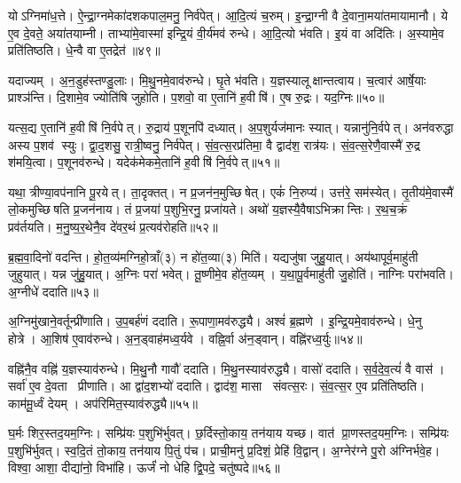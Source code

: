 योऽग्निमा॑ध॒त्ते।
ऐ॒न्द्रा॒ग्नमेका॑दशकपाल॒मनु॒ निर्व॑पेत्।
आ॒दि॒त्यं च॒रुम्।
इ॒न्द्रा॒ग्नी वै दे॒वाना॒मया॑तमायामानौ।
ये ए॒व दे॒वते॒ अया॑तयाम्नी।
ताभ्या॑मे॒वास्मा॑ इन्द्रि॒यं वी॒र्य॑मव॑ रुन्धे।
आ॒दि॒त्यो भ॑वति।
इ॒यं वा अदि॑तिः।
अ॒स्यामे॒व प्रति॑तिष्ठति।
धे॒न्वै वा ए॒तद्रेत॑॥४९॥

यदाज्यम्।
अ॒न॒डुह॑स्तण्डु॒लाः।
मि॒थु॒नमे॒वाव॑रुन्धे।
घृ॒ते भ॑वति।
य॒ज्ञस्यालूक्षान्तत्वाय।
च॒त्वार॑ आर्\mbox{}षे॒याः प्राश्ञ॑न्ति।
दि॒शामे॒व ज्योति॑षि जुहोति।
प॒शवो॒ वा ए॒तानि॑ ह॒वीषि॑।
ए॒ष रु॒द्रः।
यद॒ग्निः॥५०॥

यत्स॒द्य ए॒तानि॑ ह॒वीषि॑ नि॒र्वपेत्।
रु॒द्राय॑ प॒शूनपि॑ दध्यात्।
अ॒प॒शुर्यज॑मानः स्यात्।
यन्नानु॑नि॒र्वपेत्।
अन॑वरुद्धा अस्य प॒शव॑ स्युः।
द्वा॒द॒शसु॒ रात्री॒ष्वनु॒ निर्व॑पेत्।
सं॒व॒त्स॒रप्र॑तिमा॒ वै द्वाद॑श॒ रात्र॑यः।
सं॒व॒त्स॒रेणै॒वास्मै॑ रु॒द्र श॑मयि॒त्वा।
प॒शूनव॑रुन्धे।
यदेक॑मेकमे॒तानि॑ ह॒वीषि॑ नि॒र्वपेत्॥५१॥

यथा॒ त्रीण्या॒वप॑नानि पू॒रयेत्।
ता॒दृक्तत्।
न प्र॒जन॑न॒\-मुच्छिषेत्।
एकं॑ नि॒रुप्य॑।
उत्त॑रे॒ सम॑स्येत्।
तृ॒तीय॑मे॒वास्मै॑ लो॒कमुच्छिषति प्र॒जन॑नाय।
तं प्र॒जया॑ प॒शुभि॒रनु॒ प्रजा॑यते।
अथो॑ य॒ज्ञस्यै॒वैषाऽभिक्रान्तिः।
र॒थ॒च॒क्रं प्रव॑र्तयति।
म॒नु॒ष्य॒र॒थेनै॒व दे॑वर॒थं प्र॒त्यव॑रोहति॥५२॥

ब्र॒ह्म॒वा॒दिनो॑ वदन्ति।
हो॒त॒व्य॑मग्निहो॒त्राँ(३) न हो॑त॒व्या(३) मिति॑।
यद्यजु॑षा जुहु॒यात्।
अय॑थापूर्व॒माहु॑ती जुहुयात्।
यन्न जु॑हु॒यात्।
अ॒ग्निः परा॑ भवेत्।
तू॒ष्णीमे॒व हो॑त॒व्यम्।
य॒था॒पू॒र्वमाहु॑ती जु॒होति॑।
नाग्निः परा॑भवति।
अ॒ग्नीधे॑ ददाति॥५३॥

अ॒ग्निमु॑खाने॒वर्तून्प्री॑णाति।
उ॒प॒बर्\mbox{}ह॑णं ददाति।
रू॒पाणा॒मव॑\-रुद्ध्यै।
अश्वं॑ ब्र॒ह्मणे।
इ॒न्द्रि॒यमे॒वाव॑रुन्धे।
धे॒नु होत्रे।
आ॒शिष॑ ए॒वाव॑रुन्धे।
अ॒न॒ड्वाह॑मध्व॒र्यवे।
वह्नि॒र्वा अ॑न॒ड्वान्।
वह्नि॑रध्व॒र्युः॥५४॥

वह्नि॑नै॒व वह्नि॑ य॒ज्ञस्याव॑रुन्धे।
मि॒थु॒नौ गावौ॑ ददाति।
मि॒थु॒नस्याव॑रुद्ध्यै।
वासो॑ ददाति।
स॒र्व॒दे॒व॒त्यं॑ वै वास॑।
सर्वा॑ ए॒व दे॒वता प्रीणाति।
आ द्वा॑द॒शभ्यो॑ ददाति।
द्वाद॑श॒ मासा संवत्स॒रः।
सं॒व॒त्स॒र ए॒व प्रति॑तिष्ठति।
काम॑मू॒र्ध्वं देयम्।
अप॑रिमित॒स्याव॑रुद्ध्यै॥५५॥\anuvakamend[आ॒दि॒त्ये तृती॑यम॒प्स्वासी॒त्तत्तेनावा॑रुन्धत॒ स्यादाप्यते॒ रेतो॒ऽग्निरेक॑मेकमे॒तानि॑ ह॒वीषि॑ नि॒र्वपेत्प्र॒त्यव॑रोहति ददात्यध्व॒र्युर्देय॒मेकं॑ च]

घ॒र्मः शिर॒स्तद॒यम॒ग्निः।
सम्प्रि॑यः प॒शुभि॑र्भुवत्।
छ॒र्दिस्तो॒काय॒ तन॑याय यच्छ।
वात॑ प्रा॒णस्तद॒यम॒ग्निः।
सम्प्रि॑यः प॒शुभि॑र्भुवत्।
स्व॒दि॒तं तो॒काय॒ तन॑याय पि॒तुं प॑च।
प्राची॒मनु॑ प्र॒दिशं॒ प्रेहि॑ वि॒द्वान्।
अ॒ग्नेर॑ग्ने पु॒रो अ॑ग्निर्भवे॒ह।
विश्वा॒ आशा॒ दीद्या॑नो॒ विभा॑हि।
ऊर्जं॑ नो धेहि द्वि॒पदे॒ चतु॑ष्पदे॥५६॥

